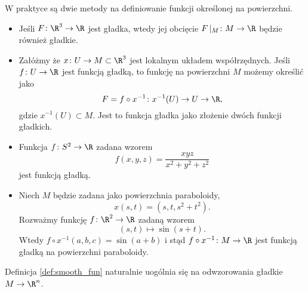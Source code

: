 \begin{frame}

 W praktyce są dwie metody na definiowanie funkcji określonej na powierzchni.
\pause \begin{itemize}[<+->]
\item Jeśli $F\colon \R^3\to \R$ jest gładka, wtedy jej obcięcie $F\,|_M\colon M\to \R$ będzie również gładkie.
\item Załóżmy że  $x\colon U\to M\subset \R^3$ jest lokalnym układem współrzędnych. Jeśli $f\colon U\to \R$ jest funkcją gładką, to funkcję  na powierzchni $M$ możemy określić jako\[F=f\circ x^{-1}\colon x^{-1}(U)\to U\to \R,\] gdzie $x^{-1}(U)\subset M$.
Jest to funkcja gładka jako złożenie dwóch funkcji gładkich.
\end{itemize}

\end{frame}
\begin{frame}[<+->]

\begin{przyklad}
\begin{itemize}
\item Funkcja $f\colon S^2\to \R$ zadana wzorem
\[f(x,y,z)=\frac{xyz}{x^2+y^2+z^2}\]
jest funkcją gładką.
\item Niech $M$ będzie zadana jako powierzchnia paraboloidy, \[x(s,t)=(s,t,s^2+t^2).\]
\pause Rozważmy funkcję $f\colon \R^2\to \R$ zadaną wzorem \[(s,t)\mapsto \sin{(s+t)}.\]
\pause Wtedy $f\circ x^{-1}(a,b,c)=\sin{(a+b)}$  i stąd $f\circ x^{-1}\colon M\to\R$ jest funkcją gładką na powierzchni paraboloidy.
\end{itemize}
\end{przyklad}

\end{frame}
\begin{uwaga}
Definicja \ref{def:smooth_fun} naturalnie uogólnia się na odwzorowania gładkie $M\to \R^n$.
\end{uwaga}

